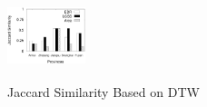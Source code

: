 \begin{figure}
	\centering
	\includegraphics[height=1in, width=0.9in]{fig/dtw_jaccard_similarity}
	\caption{Jaccard Similarity Based on DTW}
	\label{fig:Jaccard}
\end{figure}
%
%
